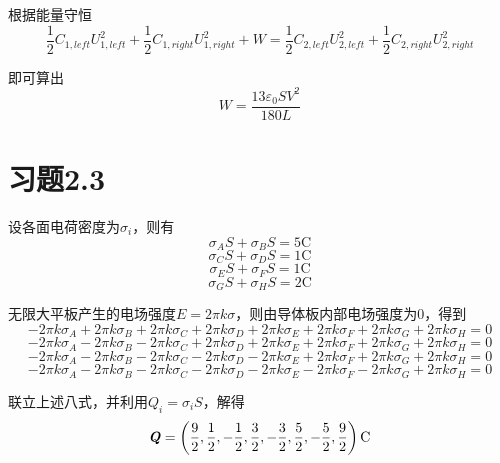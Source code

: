 \documentclass{SCIS2020cn}
\begin{document}
根据能量守恒
\begin{equation}
    \frac{1}{2}C_{1,left}U_{1,left}^2+\frac{1}{2}C_{1,right}U_{1,right}^2+W=\frac{1}{2}C_{2,left}U_{2,left}^2+\frac{1}{2}C_{2,right}U_{2,right}^2
\end{equation}

即可算出
\begin{equation}
    W=\frac{13\varepsilon_0SV^2}{180L}
\end{equation}
\section{习题2.3}
设各面电荷密度为$\sigma_i$，则有
\begin{equation}
    \sigma_AS+\sigma_BS=5\text{C}
\end{equation}
\begin{equation}
    \sigma_CS+\sigma_DS=1\text{C}
\end{equation}
\begin{equation}
    \sigma_ES+\sigma_FS=1\text{C}
\end{equation}
\begin{equation}
    \sigma_GS+\sigma_HS=2\text{C}
\end{equation}

无限大平板产生的电场强度$E=2\pi{}k\sigma$，则由导体板内部电场强度为0，得到
\begin{equation}
    -2\pi{}k\sigma_A+2\pi{}k\sigma_B+2\pi{}k\sigma_C+2\pi{}k\sigma_D+2\pi{}k\sigma_E+2\pi{}k\sigma_F+2\pi{}k\sigma_G+2\pi{}k\sigma_H=0
\end{equation}
\begin{equation}
    -2\pi{}k\sigma_A-2\pi{}k\sigma_B-2\pi{}k\sigma_C+2\pi{}k\sigma_D+2\pi{}k\sigma_E+2\pi{}k\sigma_F+2\pi{}k\sigma_G+2\pi{}k\sigma_H=0
\end{equation}
\begin{equation}
    -2\pi{}k\sigma_A-2\pi{}k\sigma_B-2\pi{}k\sigma_C-2\pi{}k\sigma_D-2\pi{}k\sigma_E+2\pi{}k\sigma_F+2\pi{}k\sigma_G+2\pi{}k\sigma_H=0
\end{equation}
\begin{equation}
    -2\pi{}k\sigma_A-2\pi{}k\sigma_B-2\pi{}k\sigma_C-2\pi{}k\sigma_D-2\pi{}k\sigma_E-2\pi{}k\sigma_F-2\pi{}k\sigma_G+2\pi{}k\sigma_H=0
\end{equation}

联立上述八式，并利用$Q_i=\sigma_iS$，解得
\begin{equation}
\textbf{\emph{Q}}=\left(\frac{9}{2},\frac{1}{2},-\frac{1}{2},\frac{3}{2},-\frac{3}{2},\frac{5}{2},-\frac{5}{2},\frac{9}{2}\right)\text{C}
\end{equation}
\end{document}
